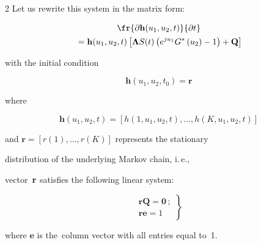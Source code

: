 \begin{multicols}{2}
Let us rewrite this system in the matrix form:


\begin{multline}


\label{eq2-p}


\fr{\partial\mathbf{h}(u_1,u_2,t)}{\partial t}\\


{}=


\mathbf{h}(u_1,u_2,t)\left[


\mathbf{\Lambda} S(t)\left( e^{ju_1}G^*\left(u_2\right)-1\right) +\mathbf{Q}\right]


\end{multline}


with the initial condition


\begin{equation}


\label{eq3}


{\mathbf{h}}\left(u_1,u_2,t_0\right)=\mathbf{r}


\end{equation}


where


$$


\mathbf{h}\left(u_1,u_2,t\right)=\left[h\left(1,u_1,u_2,t\right),\ldots,


h\left(K,u_1,u_2,t\right)\right]


$$


and ${\mathbf{r}}=[r(1),\ldots,r(K)]$ represents the stationary 


distribution of the underlying Markov chain, i.\,e., 


vector~$\bf{r}$ satisfies the following linear system:


\begin{equation}


\label{eq4}


\left.


\begin{array}{l}


\mathbf{rQ}=\mathbf{0}\,; \\[6pt]


\mathbf{re}=1


\end{array}


\right\}


\end{equation}


where $\mathbf{e}$ is the~column vector with all entries equal to~1.






\end{multicols}
